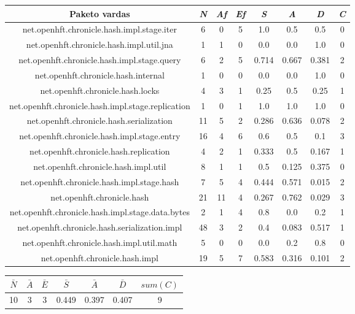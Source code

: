 \begin{center}
    \begin{tabular}{|c|c|c|c|c|c|c|c|}
        \hline
        Paketo vardas & \textit{N} & \textit{Af} & \textit{Ef} & \textit{S} & \textit{A} & \textit{D} & \textit{C} \\ [0.5ex]
        \hline\hline
        net.openhft.chronicle.hash.impl.stage.iter & 6 & 0 & 5 & 1.0 & 0.5 & 0.5 & 0 \\
        \hline
        net.openhft.chronicle.hash.impl.util.jna & 1 & 1 & 0 & 0.0 & 0.0 & 1.0 & 0 \\
        \hline
        net.openhft.chronicle.hash.impl.stage.query & 6 & 2 & 5 & 0.714 & 0.667 & 0.381 & 2 \\
        \hline
        net.openhft.chronicle.hash.internal & 1 & 0 & 0 & 0.0 & 0.0 & 1.0 & 0 \\
        \hline
        net.openhft.chronicle.hash.locks & 4 & 3 & 1 & 0.25 & 0.5 & 0.25 & 1 \\
        \hline
        net.openhft.chronicle.hash.impl.stage.replication & 1 & 0 & 1 & 1.0 & 1.0 & 1.0 & 0 \\
        \hline
        net.openhft.chronicle.hash.serialization & 11 & 5 & 2 & 0.286 & 0.636 & 0.078 & 2 \\
        \hline
        net.openhft.chronicle.hash.impl.stage.entry & 16 & 4 & 6 & 0.6 & 0.5 & 0.1 & 3 \\
        \hline
        net.openhft.chronicle.hash.replication & 4 & 2 & 1 & 0.333 & 0.5 & 0.167 & 1 \\
        \hline
        net.openhft.chronicle.hash.impl.util & 8 & 1 & 1 & 0.5 & 0.125 & 0.375 & 0 \\
        \hline
        net.openhft.chronicle.hash.impl.stage.hash & 7 & 5 & 4 & 0.444 & 0.571 & 0.015 & 2 \\
        \hline
        net.openhft.chronicle.hash & 21 & 11 & 4 & 0.267 & 0.762 & 0.029 & 3\\
        \hline
        net.openhft.chronicle.hash.impl.stage.data.bytes & 2 & 1 & 4 & 0.8 & 0.0 & 0.2 & 1 \\
        \hline
        net.openhft.chronicle.hash.serialization.impl & 48 & 3 & 2 & 0.4 & 0.083 & 0.517 & 1 \\
        \hline
        net.openhft.chronicle.hash.impl.util.math & 5 & 0 & 0 & 0.0 & 0.2 & 0.8 & 0 \\
        \hline
        net.openhft.chronicle.hash.impl & 19 & 5 & 7 & 0.583 & 0.316 & 0.101 & 2 \\
        \hline
    \end{tabular}
    \begin{tabular}{|c|c|c|c|c|c|c|}
        \hline
        $\bar{N}$ & $\bar{A}$ & $\bar{E}$ & $\bar{S}$ & $\bar{A}$ & $\bar{D}$ & $sum(C)$ \\ [0.5ex]
        \hline\hline
        10 & 3 & 3 & 0.449 & 0.397 & 0.407 & 9 \\
        \hline
    \end{tabular}
\end{center}
